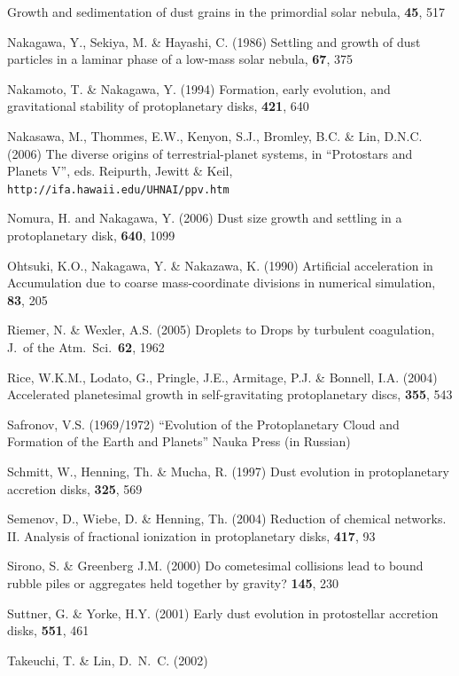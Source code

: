 \begin{literature}
  Growth and sedimentation of dust grains in the primordial solar nebula,
  \ica \textbf{45}, 517
\item Nakagawa, Y., Sekiya, M. \& Hayashi, C. (1986) 
  Settling and growth of dust particles in a laminar phase of 
  a low-mass solar nebula,
  \ica \textbf{67}, 375
\item Nakamoto, T. \& Nakagawa, Y. (1994) 
  Formation, early evolution, and gravitational stability 
  of protoplanetary disks,
  \apj \textbf{421}, 640
\item Nakasawa, M., Thommes, E.W., Kenyon, S.J., Bromley, B.C. \& Lin,
  D.N.C. (2006) 
  The diverse origins of terrestrial-planet systems,
  in ``Protostars and Planets V'', eds. Reipurth, Jewitt \&
  Keil,\\ {\tt http://ifa.hawaii.edu/UHNAI/ppv.htm}
\item Nomura, H. and Nakagawa, Y. (2006) Dust size growth and
  settling in a protoplanetary disk, 
  \apj \textbf{640}, 1099
\item Ohtsuki, K.O., Nakagawa, Y. \& Nakazawa, K. (1990)
  Artificial acceleration in Accumulation due to coarse mass-coordinate 
  divisions in numerical simulation,
  \ica \textbf{83}, 205 
\item Riemer, N. \& Wexler, A.S. (2005) 
  Droplets to Drops by turbulent coagulation,
  J.\ of the Atm.\ Sci.\ \textbf{62}, 1962
\item Rice, W.K.M., Lodato, G., Pringle, J.E., Armitage, P.J. \& Bonnell,
  I.A. (2004)
  Accelerated planetesimal growth in self-gravitating protoplanetary discs,
  \mnras \textbf{355}, 543
\item Safronov, V.S. (1969/1972) ``Evolution of the Protoplanetary Cloud and
  Formation of the Earth and Planets'' Nauka Press (in Russian)
\item Schmitt, W., Henning, Th. \& Mucha, R. (1997)
  Dust evolution in protoplanetary accretion disks,
  \aap \textbf{325}, 569
\item Semenov, D., Wiebe, D. \& Henning, Th. (2004)
  Reduction of chemical networks. II. Analysis of fractional ionization
  in protoplanetary disks,
  \aap \textbf{417}, 93
\item Sirono, S. \& Greenberg J.M. (2000)
  Do cometesimal collisions lead to bound rubble piles or aggregates
  held together by gravity?
  \ica \textbf{145}, 230
\item Suttner, G. \& Yorke, H.Y. (2001) 
  Early dust evolution in protostellar accretion disks,
  \apj \textbf{551}, 461
\item Takeuchi, T. \& Lin, D.~N.~C. (2002) 

\end{literature}
